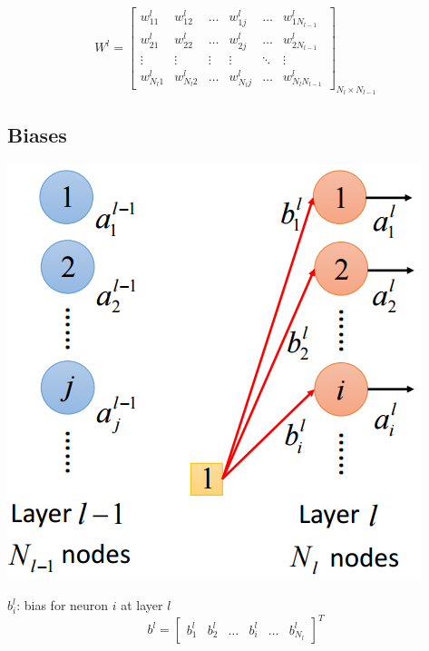 \documentclass{article}
\begin{document}
\[
W^l
=
\begin{bmatrix}
    w^l_{11} & w^l_{12} & \dots & w^l_{1j} & \dots  & w^l_{1N_{l-1}} \\
    w^l_{21} & w^l_{22} & \dots & w^l_{2j} & \dots  & w^l_{2N_{l-1}} \\
    \vdots & \vdots & \vdots & \vdots & \ddots & \vdots \\
    w^l_{N_l1} & w^l_{N_l2} & \dots & w^l_{N_lj} & \dots & w^l_{N_lN_{l-1}}
\end{bmatrix}_{N_l\times N_{l-1}}
\]

\subsection{Biases}
\begin{center}
\includegraphics[scale=0.4]{biases}
\end{center}
$b^l_i$: bias for neuron $i$ at layer $l$
\[
b^l
=
\begin{bmatrix}
    b^l_{1} & b^l_{2} & \dots & b^l_{i} & \dots  & b^l_{N_l}
\end{bmatrix}^T
\]
\end{document}

